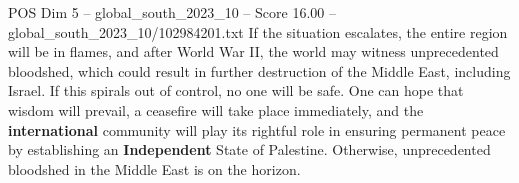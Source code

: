 \begin{textsample}{POS Dim 5 – global\_south\_2023\_10 – Score 16.00 – global\_south\_2023\_10/102984201.txt}
If the situation escalates, the entire region will be in flames, and after World War II, the world may witness unprecedented bloodshed, which could result in further destruction of the Middle East, including Israel.
If this spirals out of control, no one will be safe.
One can hope that wisdom will prevail, a ceasefire will take place immediately, and the \textbf{international} community will play its rightful role in ensuring permanent peace by establishing an \textbf{Independent} State of Palestine.
Otherwise, unprecedented bloodshed in the Middle East is on the horizon.

\end{textsample}
